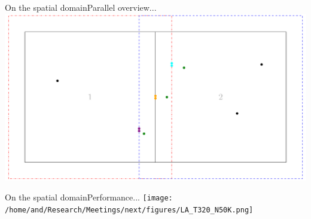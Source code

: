 \documentclass{beamer}
\begin{document}
\begin{frame}{On the spatial domain}{Parallel overview...}
    \centering
    \includegraphics[page=4,width=\textwidth]{figures/merge}
\end{frame}

\begin{frame}{On the spatial domain}{Performance...}
    \centering
    \texttt{[image: /home/and/Research/Meetings/next/figures/LA\_T320\_N50K.png]}
\end{frame}
\end{document}
